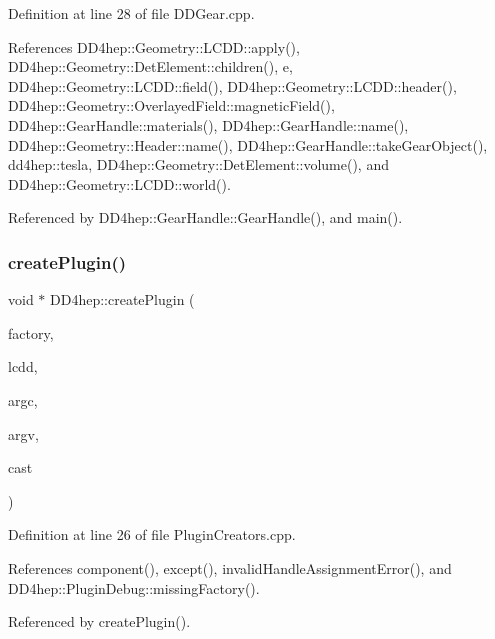 Definition at line 28 of file D\+D\+Gear.\+cpp.



References D\+D4hep\+::\+Geometry\+::\+L\+C\+D\+D\+::apply(), D\+D4hep\+::\+Geometry\+::\+Det\+Element\+::children(), e, D\+D4hep\+::\+Geometry\+::\+L\+C\+D\+D\+::field(), D\+D4hep\+::\+Geometry\+::\+L\+C\+D\+D\+::header(), D\+D4hep\+::\+Geometry\+::\+Overlayed\+Field\+::magnetic\+Field(), D\+D4hep\+::\+Gear\+Handle\+::materials(), D\+D4hep\+::\+Gear\+Handle\+::name(), D\+D4hep\+::\+Geometry\+::\+Header\+::name(), D\+D4hep\+::\+Gear\+Handle\+::take\+Gear\+Object(), dd4hep\+::tesla, D\+D4hep\+::\+Geometry\+::\+Det\+Element\+::volume(), and D\+D4hep\+::\+Geometry\+::\+L\+C\+D\+D\+::world().



Referenced by D\+D4hep\+::\+Gear\+Handle\+::\+Gear\+Handle(), and main().

\hypertarget{namespace_d_d4hep_ade40a96f4a17f0bf9cc042946bf4a5aa}{}\label{namespace_d_d4hep_ade40a96f4a17f0bf9cc042946bf4a5aa} 
\subsubsection{\texorpdfstring{create\+Plugin()}{createPlugin()}\hspace{0.1cm}{\footnotesize\ttfamily [1/6]}}
{\footnotesize\ttfamily void $\ast$ D\+D4hep\+::create\+Plugin (\begin{DoxyParamCaption}\item[{const std\+::string \&}]{factory,  }\item[{\hyperlink{class_d_d4hep_1_1_geometry_1_1_l_c_d_d}{Geometry\+::\+L\+C\+DD} \&}]{lcdd,  }\item[{int}]{argc,  }\item[{char $\ast$$\ast$}]{argv,  }\item[{void $\ast$($\ast$)(void $\ast$)}]{cast }\end{DoxyParamCaption})}



Definition at line 26 of file Plugin\+Creators.\+cpp.



References component(), except(), invalid\+Handle\+Assignment\+Error(), and D\+D4hep\+::\+Plugin\+Debug\+::missing\+Factory().



Referenced by create\+Plugin().

